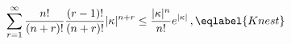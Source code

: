 \begin{equation}
\sum_{r=1}^{\infty}\frac{n!}{(n+r)!}\frac{(r-1)!}{(n+r)!}|\kappa|^{n+r}
\leq  \frac{|\kappa|^{n}}{n!} e^{|\kappa|} \,,
\eqlabel{Knest}
\end{equation} 
